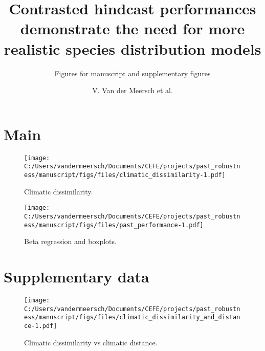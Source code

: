 \documentclass[
]{article}
\title{Contrasted hindcast performances demonstrate the need for more
realistic species distribution models}
\subtitle{Figures for manuscript and supplementary figures}
\author{V. Van der Meersch et al.}
\date{}
\begin{document}
\maketitle

\hypertarget{main}{%
\section{Main}\label{main}}

\begin{figure}
\centering
\texttt{[image: C:/Users/vandermeersch/Documents/CEFE/projects/past\_robustness/manuscript/figs/files/climatic\_dissimilarity-1.pdf]}
\caption{Climatic dissimilarity.}
\end{figure}

\newpage

\newpage

\begin{figure}
\centering
\texttt{[image: C:/Users/vandermeersch/Documents/CEFE/projects/past\_robustness/manuscript/figs/files/past\_performance-1.pdf]}
\caption{Beta regression and boxplots.}
\end{figure}

\newpage

\hypertarget{supplementary-data}{%
\section{Supplementary data}\label{supplementary-data}}

\renewcommand{\thefigure}{A.\arabic{figure}}
\setcounter{figure}{0}

\begin{figure}
\centering
\texttt{[image: C:/Users/vandermeersch/Documents/CEFE/projects/past\_robustness/manuscript/figs/files/climatic\_dissimilarity\_and\_distance-1.pdf]}
\caption{Climatic dissimilarity vs climatic distance.}
\end{figure}
\end{document}
